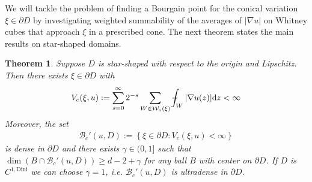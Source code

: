 \documentclass[a4paper,12pt]{article}
\newtheorem{theorem}{Theorem}[section]
\theoremstyle{definition}
\theoremstyle{definition}
\def\Xint#1{\mathchoice
	{\XXint\displaystyle\textstyle{#1}}%
	{\XXint\textstyle\scriptstyle{#1}}%
	{\XXint\scriptstyle\scriptscriptstyle{#1}}%
	{\XXint\scriptscriptstyle\scriptscriptstyle{#1}}%
	\!\int}
\def\XXint#1#2#3{{\setbox0=\hbox{$#1{#2#3}{\int}$ }
		\vcenter{\hbox{$#2#3$ }}\kern-.568\wd0}}
\def\dashint{\Xint-}
\begin{document}
 	We will tackle the problem of finding a Bourgain point for the conical variation $\xi\in\partial D$ by investigating weighted summability of the averages of $|\nabla u|$ on Whitney cubes that approach $\xi$ in a prescribed cone. The next theorem states the main results on star-shaped domains. 
	\begin{theorem}\label{thm:MainThm3}
		Suppose $D$ is star-shaped with respect to the origin and Lipschitz. Then there exists $\xi\in \partial D$ with
		\begin{align*}
			V_c(\xi,u):=\sum_{s=0}^{\infty}2^{-s}\sum_{W\in\mathcal{W}_s(\xi)}\dashint_W|\nabla u(z)|\mathrm{d}z<\infty
		\end{align*}
		Moreover, the set
		\begin{align*}
			\mathcal B_c'(u, D):=\left\lbrace\xi\in\partial D:V_c(\xi,u)<\infty\right\rbrace
		\end{align*}
		is dense in $\partial D$ and there exists $\gamma\in(0,1]$ such that $\dim(B\cap\mathcal B_c'(u,D))\geq d-2+\gamma$ for any ball $B$ with center on $\partial D$. If $D$ is $C^{1,\mathrm{Dini}}$ we can choose $\gamma=1$, i.e. $\mathcal{B}_c'(u, D)$ is ultradense in $\partial D$.
	\end{theorem}
	
\end{document}
